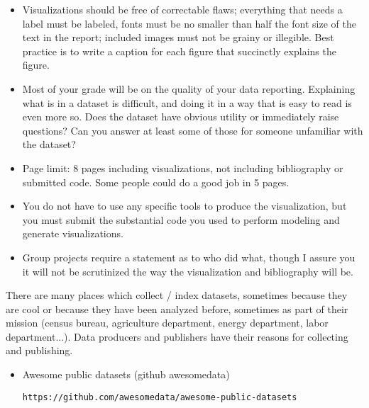 \documentclass[]{book}
\theoremstyle{definition}
\begin{document}
\begin{enumerate}
\begin{itemize}
\item Visualizations should be free of correctable flaws; everything that needs a label must be labeled, fonts must be no smaller than half the font size of the text in the report; included images must not be grainy or illegible.  Best practice is to write a caption for each figure that succinctly explains the figure.

\item Most of your grade will be on the quality of your data reporting. Explaining what is in a dataset is difficult, and doing it in a way that is easy to read is even more so.  Does the dataset have obvious utility or immediately raise questions?  Can you answer at least some of those for someone unfamiliar with the dataset?

\item Page limit: 8 pages including visualizations, not including bibliography or submitted code.  Some people could do a good job in 5 pages.

\item You do not have to use any specific tools to produce the visualization, but you must submit the substantial code you used to perform modeling and generate visualizations.  

\item Group projects require a statement as to who did what, though I assure you it will not be scrutinized the way the visualization and bibliography will be.  

\end{itemize}

There are many places which collect / index datasets, sometimes because they are cool or because they have been analyzed before, sometimes as part of their mission (census bureau, agriculture department, energy department, labor department...).  Data producers and publishers have their reasons for collecting and publishing.

\begin{itemize}

\item  Awesome public datasets (github awesomedata)

\texttt{https://github.com/awesomedata/awesome-public-datasets}



\end{itemize}
\end{enumerate}
\end{document}
